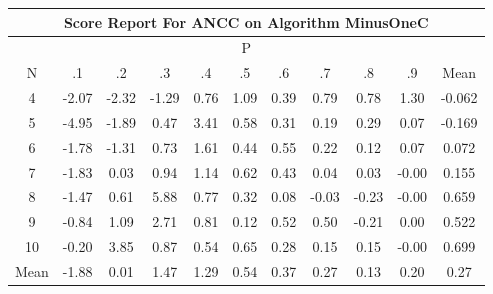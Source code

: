 \documentclass[11pt,a4paper]{report}
\begin{document}
\begin{longtable}{ | c || c | c | c | c | c | c | c | c | c || c |}
\hline
\multicolumn{11}{|c|}{ Score Report For ANCC on Algorithm MinusOneC} \\
\hline
\multicolumn{11}{|c|}{ P } \\
\hline
N & .1 & .2 & .3 & .4 & .5 & .6 & .7 & .8 & .9 & Mean\\
 \hline
 \hline
 \endhead
  4 &  \cellcolor[HTML]{FFC7C7} -2.07 &  \cellcolor[HTML]{FFC7C7} -2.32 &  \cellcolor[HTML]{FFDFDF} -1.29 &  \cellcolor[HTML]{EFEFFF} 0.76 &  \cellcolor[HTML]{E7E7FF} 1.09 &  \cellcolor[HTML]{F7F7FF} 0.39 &  \cellcolor[HTML]{EFEFFF} 0.79 &  \cellcolor[HTML]{EFEFFF} 0.78 &  \cellcolor[HTML]{DFDFFF} 1.30 & -0.062 \\
  5 &  \cellcolor[HTML]{FF8080} -4.95 &  \cellcolor[HTML]{FFCFCF} -1.89 &  \cellcolor[HTML]{F7F7FF} 0.47 &  \cellcolor[HTML]{A7A7FF} 3.41 &  \cellcolor[HTML]{EFEFFF} 0.58 &  \cellcolor[HTML]{F7F7FF} 0.31 &  \cellcolor[HTML]{F7F7FF} 0.19 &  \cellcolor[HTML]{F7F7FF} 0.29 &  \cellcolor[HTML]{FFFFFF} 0.07 & -0.169 \\
  6 &  \cellcolor[HTML]{FFCFCF} -1.78 &  \cellcolor[HTML]{FFDFDF} -1.31 &  \cellcolor[HTML]{EFEFFF} 0.73 &  \cellcolor[HTML]{D7D7FF} 1.61 &  \cellcolor[HTML]{F7F7FF} 0.44 &  \cellcolor[HTML]{EFEFFF} 0.55 &  \cellcolor[HTML]{F7F7FF} 0.22 &  \cellcolor[HTML]{FFFFFF} 0.12 &  \cellcolor[HTML]{FFFFFF} 0.07 & 0.072 \\
  7 &  \cellcolor[HTML]{FFCFCF} -1.83 &  \cellcolor[HTML]{FFFFFF} 0.03 &  \cellcolor[HTML]{E7E7FF} 0.94 &  \cellcolor[HTML]{DFDFFF} 1.14 &  \cellcolor[HTML]{EFEFFF} 0.62 &  \cellcolor[HTML]{F7F7FF} 0.43 &  \cellcolor[HTML]{FFFFFF} 0.04 &  \cellcolor[HTML]{FFFFFF} 0.03 &  \cellcolor[HTML]{FFFFFF} -0.00 & 0.155 \\
  8 &  \cellcolor[HTML]{FFD7D7} -1.47 &  \cellcolor[HTML]{EFEFFF} 0.61 &  \cellcolor[HTML]{6868FF} 5.88 &  \cellcolor[HTML]{EFEFFF} 0.77 &  \cellcolor[HTML]{F7F7FF} 0.32 &  \cellcolor[HTML]{FFFFFF} 0.08 &  \cellcolor[HTML]{FFFFFF} -0.03 &  \cellcolor[HTML]{FFF7F7} -0.23 &  \cellcolor[HTML]{FFFFFF} -0.00 & 0.659 \\
  9 &  \cellcolor[HTML]{FFE7E7} -0.84 &  \cellcolor[HTML]{E7E7FF} 1.09 &  \cellcolor[HTML]{B7B7FF} 2.71 &  \cellcolor[HTML]{E7E7FF} 0.81 &  \cellcolor[HTML]{FFFFFF} 0.12 &  \cellcolor[HTML]{EFEFFF} 0.52 &  \cellcolor[HTML]{EFEFFF} 0.50 &  \cellcolor[HTML]{FFF7F7} -0.21 &  \cellcolor[HTML]{FFFFFF} 0.00 & 0.522 \\
  10 &  \cellcolor[HTML]{FFF7F7} -0.20 &  \cellcolor[HTML]{9F9FFF} 3.85 &  \cellcolor[HTML]{E7E7FF} 0.87 &  \cellcolor[HTML]{EFEFFF} 0.54 &  \cellcolor[HTML]{EFEFFF} 0.65 &  \cellcolor[HTML]{F7F7FF} 0.28 &  \cellcolor[HTML]{FFFFFF} 0.15 &  \cellcolor[HTML]{FFFFFF} 0.15 &  \cellcolor[HTML]{FFFFFF} -0.00 & 0.699 \\
 \hline
 \hline
Mean &  \cellcolor[HTML]{FFCFCF} -1.88 &  \cellcolor[HTML]{FFFFFF} 0.01 &  \cellcolor[HTML]{D7D7FF} 1.47 &  \cellcolor[HTML]{DFDFFF} 1.29 &  \cellcolor[HTML]{EFEFFF} 0.54 &  \cellcolor[HTML]{F7F7FF} 0.37 &  \cellcolor[HTML]{F7F7FF} 0.27 &  \cellcolor[HTML]{FFFFFF} 0.13 &  \cellcolor[HTML]{F7F7FF} 0.20 &  \cellcolor[HTML]{F7F7FF} 0.27
\end{longtable}
\end{document}
